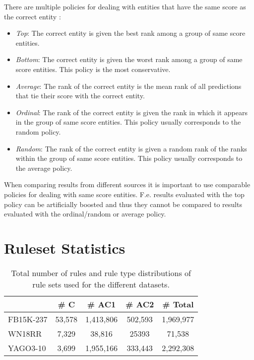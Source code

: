 \documentclass[akbc,twoside,11pt,lettersize]{article}
\begin{document}
There are multiple policies for dealing with entities that have the same score as the correct entity \cite{Rossi2021}: 

\begin{itemize}
  \item \textit{Top}: The correct entity is given the best rank among a group of same score entities.
  \item \textit{Bottom}: The correct entity is given the worst rank among a group of same score entities. This policy is the most conservative.
  \item \textit{Average}: The rank of the correct entity is the mean rank of all predictions that tie their score with the correct entity.
  \item \textit{Ordinal}: The rank of the correct entity is given the rank in which it appears in the group of same score entities. This policy usually corresponds to the random policy.
  \item \textit{Random}: The rank of the correct entity is given a random rank of the ranks within the group of same score entities. This policy usually corresponds to the average policy.
\end{itemize}

When comparing results from different sources it is important to use comparable policies for dealing with same score entities. F.e. results evaluated with the top policy can be artificially boosted and thus they cannot be compared to results evaluated with the ordinal/random or average policy.

\section{Ruleset Statistics}

\begin{table}[H]
    \centering
    \begin{tabular}{lcccc}
    \hline
         & \# C & \# AC1 & \# AC2 & \# Total \\ \hline
        FB15K-237 & 53,578 & 1,413,806 & 502,593 & 1,969,977 \\
        WN18RR & 7,329 & 38,816 & 25393 & 71,538 \\ 
        YAGO3-10 & 3,699 & 1,955,166 & 333,443 & 2,292,308 \\ \hline
    \end{tabular}
    \caption{ Total number of rules and rule type distributions of rule sets used for the different datasets.}
    \label{numrules}
\end{table}
\end{document}
